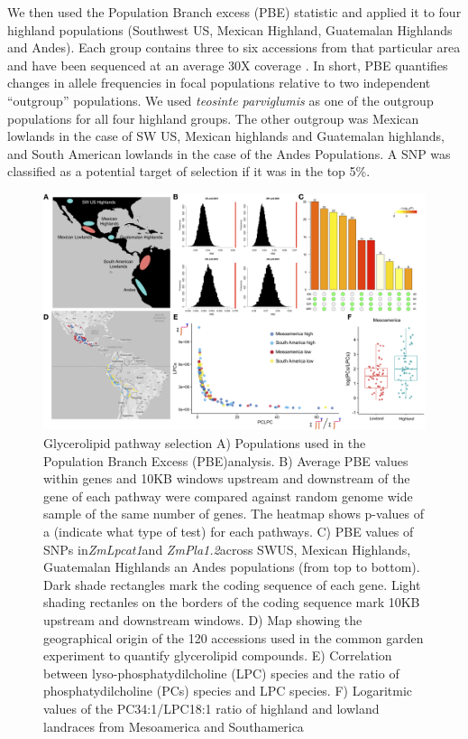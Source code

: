 \documentclass[9pt,twocolumn,twoside,lineno]{gsajnl}
\begin{document}
We then used the Population Branch excess (PBE) statistic \cite{Pool2017-oa} and applied it to four highland populations (Southwest US, Mexican Highland, Guatemalan Highlands and Andes). 
Each group contains three to six accessions from that particular area and have been sequenced at an average 30X coverage \cite{Wang2017-bc}. 
In short, PBE quantifies changes in allele frequencies in focal populations relative to two independent “outgroup” populations. We used \textit{teosinte parviglumis} as one of the outgroup populations for all four highland groups. 
The other outgroup was Mexican lowlands in the case of SW US, Mexican highlands and Guatemalan highlands, and South American lowlands in the case of the Andes Populations. A SNP was classified as a potential target of selection if it was in the top 5\%. 
\begin{figure}[ht]
\begin{center}
\includegraphics[width=0.8\paperwidth]{Figures/Fig_1.png}
\caption{Glycerolipid pathway selection 
A) Populations used in the Population Branch Excess (PBE)analysis. 
B) Average PBE values within genes and 10KB windows upstream and downstream of the gene of each pathway were compared against random genome wide sample of the same number of genes. The heatmap shows p-values of a (indicate what type of test) for each pathways. 
C) PBE values of SNPs in\textit{ZmLpcat1}and\textit{ ZmPla1.2}across SWUS, Mexican Highlands, Guatemalan Highlands an Andes populations (from top to bottom). Dark shade rectangles mark the coding sequence of each gene. Light shading rectanles on the borders of the coding sequence mark 10KB upstream and downstream windows. 
D) Map showing the geographical origin of the 120 accessions used in the common garden experiment to quantify glycerolipid compounds.
E) Correlation between  lyso-phosphatydilcholine (LPC) species and the ratio of  phosphatydilcholine (PCs) species and LPC species. 
F) Logaritmic values of the PC34:1/LPC18:1 ratio of highland and lowland landraces from Mesoamerica and Southamerica}
\label{Fig1}
\end{center}
\end{figure} 
\end{document}

